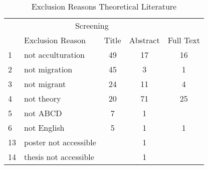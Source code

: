 \begin{table}
\begin{minipage}[t][\textheight][t]{\textwidth}

\caption{\label{tab:TheoryExclusion}Exclusion Reasons Theoretical Literature}
\begin{tabular}[t]{llccc}
\toprule
\multicolumn{1}{c}{ } & \multicolumn{3}{c}{Screening} \\
\cmidrule(l{3pt}r{3pt}){2-4}
  & Exclusion Reason & Title & Abstract & Full Text\\
\midrule
1 & not acculturation & 49 & 17 & 16\\
2 & not migration & 45 & 3 & 1\\
3 & not migrant & 24 & 11 & 4\\
4 & not theory & 20 & 71 & 25\\
5 & not ABCD & 7 & 1 & \\
6 & not English & 5 & 1 & 1\\
13 & poster not accessible &  & 1 & \\
14 & thesis not accessible &  & 1 & \\
\bottomrule
\end{tabular}
\end{minipage}
\end{table}
